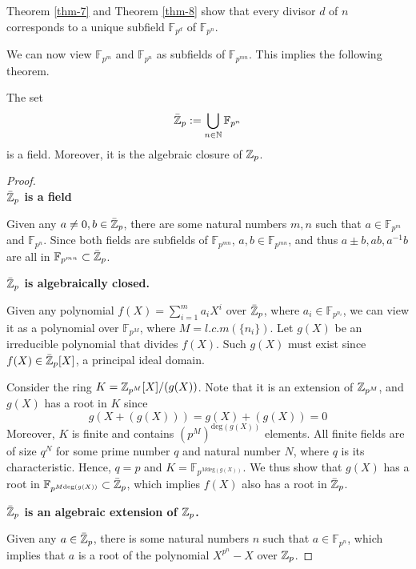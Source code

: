 Theorem \ref{thm-7} and Theorem \ref{thm-8} show that every divisor $d$ of $n$ corresponds to a unique subfield $\mathbb{F}_{p^d}$ of $\mathbb{F}_{p^n}$.

We can now view $\mathbb{F}_{p^m}$ and $\mathbb{F}_{p^n}$ as subfields of $\mathbb{F}_{p^{mn}}$. This implies the following theorem.

\begin{theorem}
The set
\[
	\bar {\mathbb{Z}}_p := \bigcup_{n \in \mathbb{N}} \mathbb{F}_{p^n}
\]
is a field. Moreover, it is the algebraic closure of $\mathbb{Z}_p$.
\end{theorem}


\begin{proof}

\mbox{} \\

\noindent \textbf{$\bar {\mathbb{Z}}_p$ is a field}

Given any $a \neq 0,b \in \bar {\mathbb{Z}}_p$, there are some natural numbers $m,n$ such that $a \in \mathbb{F}_{p^m}$ and $\mathbb{F}_{p^n}$. Since both fields are subfields of $\mathbb{F}_{p^{mn}}$, $a,b \in \mathbb{F}_{p^{mn}}$, and thus $a\pm b, ab, a^{-1}b$ are all in $\mathbb{F}_{p^{mn}} \subset \bar {\mathbb{Z}}_p$.

\vspace{4pt}
\noindent \textbf{$\bar {\mathbb{Z}}_p$ is algebraically closed.}

Given any polynomial $f(X) = \sum_{i=1}^m a_iX^i$ over $\bar {\mathbb{Z}}_p$, where $a_i \in \mathbb{F}_{p^{n_i}}$, we can view it as a polynomial over $\mathbb{F}_{p^M}$, where $M = l.c.m(\{n_i\})$. Let $g(X)$ be an irreducible polynomial that divides $f(X)$. Such $g(X)$ must exist since $f(X) \in \bar {\mathbb{Z}}_p[X]$, a principal ideal domain.

Consider the ring $K = \mathbb{Z}_{p^M}[X] /(g(X))$. Note that it is an extension of $\mathbb{Z}_{p^M}$, and $g(X)$ has a root in $K$ since
\[
	g(X + (g(X))) = g(X) + (g(X)) = 0
\]
Moreover, $K$ is finite and contains $(p^M)^{\text{deg}(g(X))}$ elements. All finite fields are of size $q^N$ for some prime number $q$ and natural number $N$, where $q$ is its characteristic. Hence, $q = p$ and $K = \mathbb{F}_{p^{M\text{deg}(g(X))}}$. We thus show that $g(X)$ has a root in $\mathbb{F}_{p^{M\text{deg}(g(X))}} \subset \bar {\mathbb{Z}}_p$, which implies $f(X)$ also has a root in $\bar{\mathbb{Z}}_p$.

\vspace{4pt}
\noindent \textbf{$\bar {\mathbb{Z}}_p$ is an algebraic extension of $\mathbb{Z}_p$.}

Given any $a \in \bar {\mathbb{Z}}_p$, there is some natural numbers $n$ such that $a \in \mathbb{F}_{p^n}$, which implies that $a$ is a root of the polynomial $X^{p^n} - X$ over $\mathbb{Z}_p$.

\end{proof}



\pagebreak

\nocite{*}
\printbibliography


